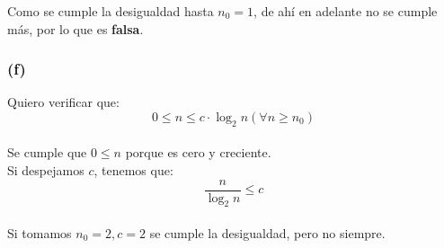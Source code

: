 \documentclass[12 pt]{article}
\begin{document}
            \begin{center}
            \end{center}

            Como se cumple la desigualdad hasta $n_{0} = 1$, de ahí en adelante no se cumple más, por lo que es \textbf{falsa}.

        \subsubsection*{(f)}
            Quiero verificar que:
            \[0 \leq n \leq c \cdot \log_{2}{n} (\forall n \geq n_{0})\]
            \\
            Se cumple que \(0 \leq n\) porque es cero y creciente.
            \\
            Si despejamos $c$, tenemos que:
            \[\frac{n}{\log_{2}{n}} \leq c\]
            \\
            Si tomamos \(n_{0} = 2, c = 2\) se cumple la desigualdad, pero no siempre.
\end{document}
